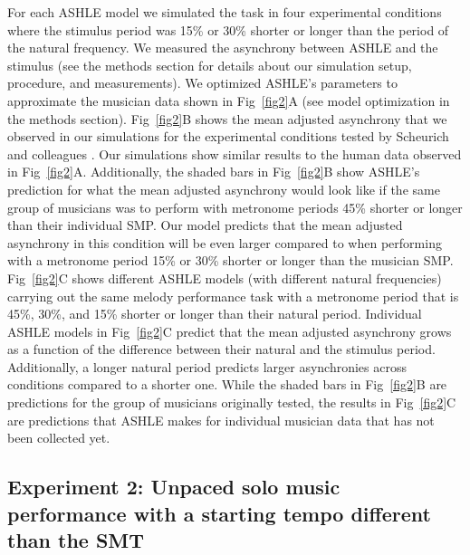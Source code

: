 \documentclass[10pt,letterpaper]{article}
\begin{document}
For each ASHLE model we simulated the task in four experimental conditions where the stimulus period was 15\% or 30\% shorter or longer than the period of the natural frequency. We measured the asynchrony between ASHLE and the stimulus (see the methods section for details about our simulation setup, procedure, and measurements). We optimized ASHLE's parameters to approximate the musician data shown in Fig~\ref{fig2}A (see model optimization in the methods section). Fig~\ref{fig2}B shows the mean adjusted asynchrony that we observed in our simulations for the experimental conditions tested by Scheurich and colleagues \cite{scheurich2018tapping}. Our simulations show similar results to the human data observed in Fig~\ref{fig2}A. Additionally, the shaded bars in Fig~\ref{fig2}B show ASHLE's prediction for what the mean adjusted asynchrony would look like if the same group of musicians was to perform with metronome periods 45\% shorter or longer than their individual SMP. Our model predicts that the mean adjusted asynchrony in this condition will be even larger compared to when performing with a metronome period 15\% or 30\% shorter or longer than the musician SMP. Fig~\ref{fig2}C shows different ASHLE models (with different natural frequencies) carrying out the same melody performance task with a metronome period that is 45\%, 30\%, and 15\% shorter or longer than their natural period. Individual ASHLE models in Fig~\ref{fig2}C predict that the mean adjusted asynchrony grows as a function of the difference between their natural and the stimulus period. Additionally, a longer natural period predicts larger asynchronies across conditions compared to a shorter one. While the shaded bars in Fig~\ref{fig2}B are predictions for the group of musicians originally tested, the results in Fig~\ref{fig2}C are predictions that ASHLE makes for individual musician data that has not been collected yet.

\subsection*{Experiment 2: Unpaced solo music performance with a starting tempo different than the SMT}
\end{document}
